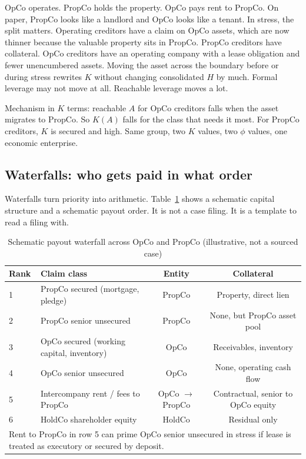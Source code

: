 \documentclass[11pt]{article}
\begin{document}
OpCo operates. PropCo holds the property. OpCo pays rent to PropCo. On paper, PropCo looks like a landlord and OpCo looks like a tenant. In stress, the split matters. Operating creditors have a claim on OpCo assets, which are now thinner because the valuable property sits in PropCo. PropCo creditors have collateral. OpCo creditors have an operating company with a lease obligation and fewer unencumbered assets. Moving the asset across the boundary before or during stress rewrites $K$ without changing consolidated $H$ by much. Formal leverage may not move at all. Reachable leverage moves a lot.

Mechanism in $K$ terms: reachable $A$ for OpCo creditors falls when the asset migrates to PropCo. So $K(A)$ falls for the class that needs it most. For PropCo creditors, $K$ is secured and high. Same group, two $K$ values, two $\phi$ values, one economic enterprise.

\subsection{Waterfalls: who gets paid in what order}

Waterfalls turn priority into arithmetic. Table~\ref{tab:waterfall} shows a schematic capital structure and a schematic payout order. It is not a case filing. It is a template to read a filing with.

\begin{table}[h]
\centering
\small
\caption{Schematic payout waterfall across OpCo and PropCo (illustrative, not a sourced case)}
\label{tab:waterfall}
\begin{tabular}{llcc}
\toprule
Rank & Claim class & Entity & Collateral \\
\midrule
1 & PropCo secured (mortgage, pledge) & PropCo & Property, direct lien \\
2 & PropCo senior unsecured & PropCo & None, but PropCo asset pool \\
3 & OpCo secured (working capital, inventory) & OpCo & Receivables, inventory \\
4 & OpCo senior unsecured & OpCo & None, operating cash flow \\
5 & Intercompany rent / fees to PropCo & OpCo $\to$ PropCo & Contractual, senior to OpCo equity \\
6 & HoldCo shareholder equity & HoldCo & Residual only \\
\midrule
\multicolumn{4}{l}{\footnotesize Rent to PropCo in row 5 can prime OpCo senior unsecured in stress if lease is treated as executory or secured by deposit.} \\
\bottomrule
\end{tabular}
\end{table}
\end{document}
